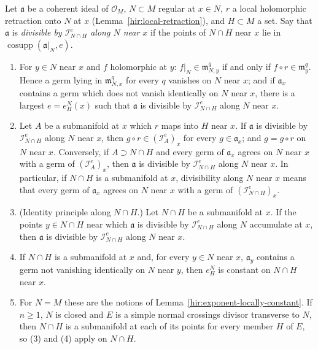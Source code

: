 \begin{lemma}
\leanok
Let \(\mathfrak a\) be a coherent ideal of \(\mathcal O_M\), \(N\subset M\) regular at \(x\in N\), \(r\) a local holomorphic retraction onto \(N\) at \(x\)
(Lemma~\ref{hir:local-retraction}), and \(H\subset M\) a set. Say that \(\mathfrak a\) is \emph{divisible by \(\mathcal I_{N\cap H}^e\) along \(N\) near \(x\)} if
the points of \(N\cap H\) near \(x\) lie in \(\operatorname{cosupp}(\mathfrak a|_N,e)\).
\begin{enumerate}
\item For \(y\in N\) near \(x\) and \(f\) holomorphic at \(y\): \(f|_N\in\mathfrak m_{N,y}^q\) if and only if \(f\circ r\in\mathfrak m_y^q\). Hence a germ lying in
\(\mathfrak m_{N,x}^q\) for every \(q\) vanishes on \(N\) near \(x\); and if \(\mathfrak a_x\) contains a germ which does not vanish identically on \(N\) near
\(x\), there is a largest \(e=e^N_H(x)\) such that \(\mathfrak a\) is divisible by \(\mathcal I_{N\cap H}^e\) along \(N\) near \(x\).
\item Let \(A\) be a submanifold at \(x\) which \(r\) maps into \(H\) near \(x\). If \(\mathfrak a\) is divisible by \(\mathcal I_{N\cap H}^e\) along \(N\) near \(x\), then
\(g\circ r\in(\mathcal I_A^e)_x\) for every \(g\in\mathfrak a_x\); and \(g=g\circ r\) on \(N\) near \(x\). Conversely, if \(A\supset N\cap H\) and every germ of
\(\mathfrak a_x\) agrees on \(N\) near \(x\) with a germ of \((\mathcal I_A^e)_x\), then \(\mathfrak a\) is divisible by \(\mathcal I_{N\cap H}^e\) along \(N\) near \(x\).
In particular, if \(N\cap H\) is a submanifold at \(x\), divisibility along \(N\) near \(x\) means that every germ of \(\mathfrak a_x\) agrees on \(N\) near \(x\) with a
germ of \((\mathcal I_{N\cap H}^e)_x\).
\item (Identity principle along \(N\cap H\).) Let \(N\cap H\) be a submanifold at \(x\). If the points \(y\in N\cap H\) near which \(\mathfrak a\) is divisible by
\(\mathcal I_{N\cap H}^e\) along \(N\) accumulate at \(x\), then \(\mathfrak a\) is divisible by \(\mathcal I_{N\cap H}^e\) along \(N\) near \(x\).
\item If \(N\cap H\) is a submanifold at \(x\) and, for every \(y\in N\) near \(x\), \(\mathfrak a_y\) contains a germ not vanishing identically on \(N\) near \(y\),
then \(e^N_H\) is constant on \(N\cap H\) near \(x\).
\item For \(N=M\) these are the notions of Lemma~\ref{hir:exponent-locally-constant}. If \(n\ge1\), \(N\) is closed and \(E\) is a simple normal crossings
divisor transverse to \(N\), then \(N\cap H\) is a submanifold at each of its points for every member \(H\) of \(E\), so (3) and (4) apply on \(N\cap H\).
\end{enumerate}
\end{lemma}
